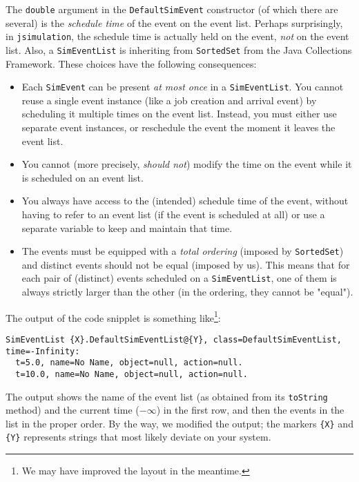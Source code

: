 \documentclass[12pt]{book}
\begin{document}
The \lstinline{double} argument in the \lstinline{DefaultSimEvent} constructor
  (of which there are several)
  is the {\em schedule time\/} of the event on the event list.
Perhaps surprisingly,
  in \lstinline{jsimulation},
  the schedule time is actually held on the event,
 {\em not\/} on the event list.
Also, a \lstinline{SimEventList} is inheriting from \lstinline{SortedSet}
  from the Java Collections Framework.
These choices have the following consequences:
\begin{itemize}
  \item Each \lstinline{SimEvent} can be present {\em at most once\/} in a \lstinline{SimEventList}.
        You cannot reuse a single event instance (like a job creation and arrival event)
          by scheduling it multiple times on the event list.
        Instead, you must either use separate event instances, or reschedule the event
          the moment it leaves the event list.
  \item You cannot (more precisely, {\em should not\/}) modify the time on the event while it is
          scheduled on an event list.
  \item You always have access to the (intended) schedule time of the event, without having to
          refer to an event list (if the event is scheduled at all) or use a separate
          variable to keep and maintain that time.
  \item The events must be equipped with a {\em total ordering\/} (imposed by \lstinline{SortedSet})
          and distinct events should not be equal (imposed by us).
          This means that for each pair of (distinct) events scheduled on a \lstinline{SimEventList},
          one of them is always strictly larger than the other
          (in the ordering, they cannot be "equal").
\end{itemize}

The output of the code snipplet is something like\footnote{
We may have improved the layout in the meantime.}:
\begin{lstlisting}[basicstyle=\tiny]
SimEventList {X}.DefaultSimEventList@{Y}, class=DefaultSimEventList, time=-Infinity:
  t=5.0, name=No Name, object=null, action=null.
  t=10.0, name=No Name, object=null, action=null.
\end{lstlisting}
The output shows the name of the event list (as obtained from its \lstinline{toString} method)
  and the current time ($-\infty$) in the first row, and then the events in the list
  in the proper order.
By the way, we modified the output; the markers \lstinline|{X}| and \lstinline|{Y}|
  represents strings that most likely deviate on your system.
\end{document}
